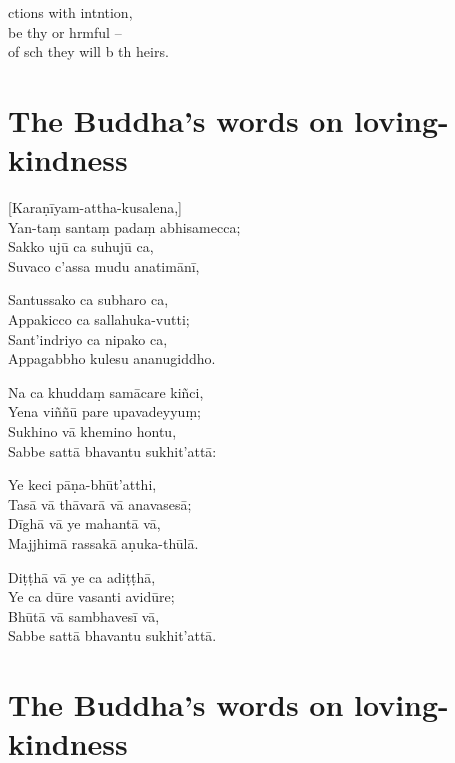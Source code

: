  ctions with intntion,\\
be thy  or hrmful --\\
of sch  they will b th heirs.

\clearpage

\chapter[Loving-kindness]{The Buddha's words on loving-kindness}                         %

\begin{leader}
\end{leader}

[Karaṇīyam-attha-kusalena,]\\
Yan-taṃ santaṃ padaṃ abhisamecca;\\
Sakko ujū ca suhujū ca,\\
Suvaco c'assa mudu anatimānī,

Santussako ca subharo ca,\\
Appakicco ca sallahuka-vutti;\\
Sant'indriyo ca nipako ca,\\
Appagabbho kulesu ananugiddho.

Na ca khuddaṃ samācare kiñci,\\
Yena viññū pare upavadeyyuṃ;\\
Sukhino vā khemino hontu,\\
Sabbe sattā bhavantu sukhit'attā:

Ye keci pāṇa-bhūt'atthi,\\
Tasā vā thāvarā vā anavasesā;\\
Dīghā vā ye mahantā vā,\\
Majjhimā rassakā aṇuka-thūlā.

Diṭṭhā vā ye ca adiṭṭhā,\\
Ye ca dūre vasanti avidūre;\\
Bhūtā vā sambhavesī vā,\\
Sabbe sattā bhavantu sukhit'attā.

\clearpage

\chapter[Loving-kindness]{The Buddha's words on loving-kindness}                         %

